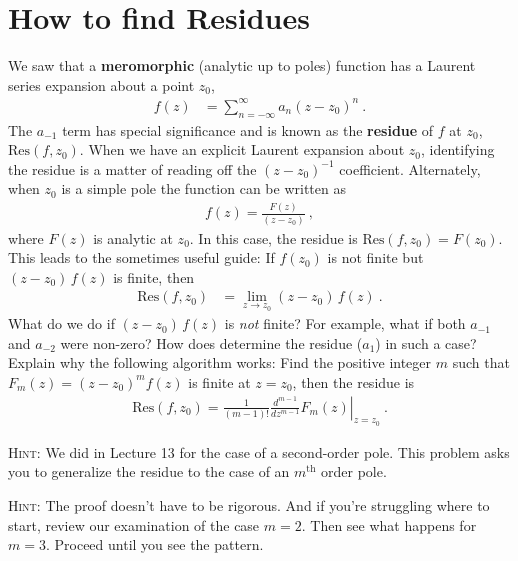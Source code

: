 \documentclass[12pt]{article}
\numberwithin{equation}{section}    %
\begin{document}

\section{How to find Residues}

We saw that a \textbf{meromorphic} (analytic up to poles) function has a Laurent series expansion about a point $z_0$,
\begin{align}
f(z) &= \sum_{n=-\infty}^{\infty} a_n (z-z_0)^n
	\ .
\end{align}
The $a_{-1}$ term has special significance and is known as the \textbf{residue} of $f$ at $z_0$, $\text{Res}(f,z_0)$. When we have an explicit Laurent expansion about $z_0$, identifying the residue is a matter of reading off the $(z-z_0)^{-1}$ coefficient. Alternately, when $z_0$ is a simple pole the function can be written as
\begin{align}
	f(z) = \frac{F(z)}{(z-z_0)} \ ,
\end{align}
where $F(z)$ is analytic at $z_0$. In this case, the residue is $\text{Res}(f,z_0) = F(z_0)$. This leads to the sometimes useful guide: If $f(z_0)$ is not finite but $(z-z_0)\, f(z)$ is finite, then
	\begin{align}
		\text{Res}(f,z_0) &=  \lim_{z\to z_0} (z-z_0)\, f(z) \ .
	\end{align}
What do we do if $(z-z_0)\, f(z)$ is \emph{not} finite? For example, what if both $a_{-1}$ and $a_{-2}$ were non-zero? How does determine the residue ($a_1$) in such a case? Explain why the following algorithm works: Find the positive integer $m$ such that $F_m(z)=(z-z_0)^m f(z)$ is finite at $z=z_0$, then the residue is
\begin{align}
	\text{Res}(f,z_0) = \left.\frac{1}{(m-1)!} \frac{d^{m-1}}{dz^{m-1}} F_m(z)\right|_{z=z_0} \ .
\end{align}

\textsc{Hint}: We did in Lecture 13 for the case of a second-order pole. This problem asks you to generalize the residue to the case of an $m^\text{th}$ order pole.

\textsc{Hint}: The proof doesn't have to be rigorous. And if you're struggling where to start, review our examination of the case $m=2$. Then see what happens for $m=3$. Proceed until you see the pattern.
\end{document}
